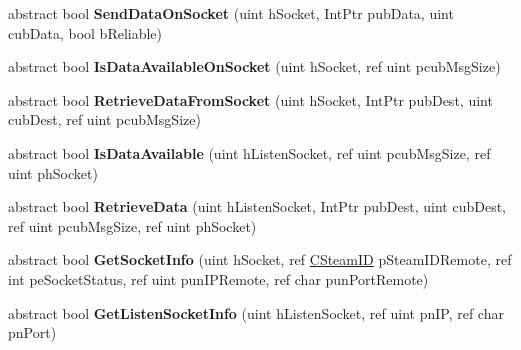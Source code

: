 \begin{DoxyCompactItemize}
\item 
\mbox{\label{class_valve_1_1_steamworks_1_1_i_steam_networking_aa1aac13d1eb9eae81245a1900810dfbe}} 
abstract bool {\bfseries Send\+Data\+On\+Socket} (uint h\+Socket, Int\+Ptr pub\+Data, uint cub\+Data, bool b\+Reliable)
\item 
\mbox{\label{class_valve_1_1_steamworks_1_1_i_steam_networking_aab9b9f7aadee3e0b75543ca3900faf81}} 
abstract bool {\bfseries Is\+Data\+Available\+On\+Socket} (uint h\+Socket, ref uint pcub\+Msg\+Size)
\item 
\mbox{\label{class_valve_1_1_steamworks_1_1_i_steam_networking_a24987cc5c67199978d17c3163d0d8794}} 
abstract bool {\bfseries Retrieve\+Data\+From\+Socket} (uint h\+Socket, Int\+Ptr pub\+Dest, uint cub\+Dest, ref uint pcub\+Msg\+Size)
\item 
\mbox{\label{class_valve_1_1_steamworks_1_1_i_steam_networking_a27e910ec24b1cf1c919f10e193a8678a}} 
abstract bool {\bfseries Is\+Data\+Available} (uint h\+Listen\+Socket, ref uint pcub\+Msg\+Size, ref uint ph\+Socket)
\item 
\mbox{\label{class_valve_1_1_steamworks_1_1_i_steam_networking_ab576bae8fa03d0d64f61ec850a28037d}} 
abstract bool {\bfseries Retrieve\+Data} (uint h\+Listen\+Socket, Int\+Ptr pub\+Dest, uint cub\+Dest, ref uint pcub\+Msg\+Size, ref uint ph\+Socket)
\item 
\mbox{\label{class_valve_1_1_steamworks_1_1_i_steam_networking_af80f899fa36d4d26e4e24e0dc4e724a4}} 
abstract bool {\bfseries Get\+Socket\+Info} (uint h\+Socket, ref \hyperlink{struct_valve_1_1_steamworks_1_1_c_steam_i_d}{C\+Steam\+ID} p\+Steam\+I\+D\+Remote, ref int pe\+Socket\+Status, ref uint pun\+I\+P\+Remote, ref char pun\+Port\+Remote)
\item 
\mbox{\label{class_valve_1_1_steamworks_1_1_i_steam_networking_a5408b0cd6273dfc1fcee5b41d948b0db}} 
abstract bool {\bfseries Get\+Listen\+Socket\+Info} (uint h\+Listen\+Socket, ref uint pn\+IP, ref char pn\+Port)

\end{DoxyCompactItemize}
